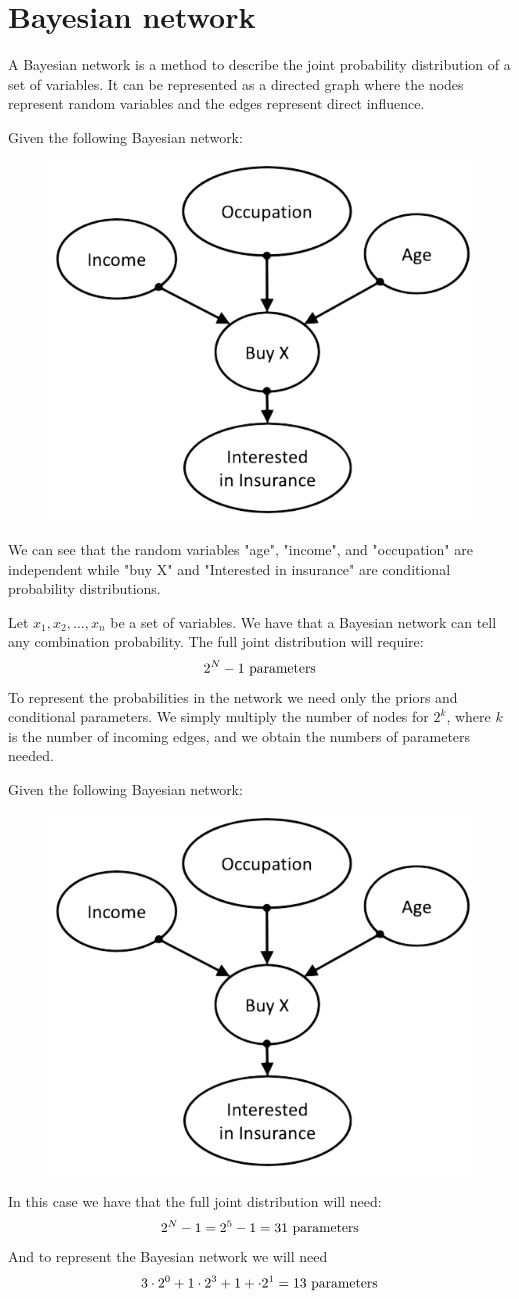 \documentclass[12pt, a4paper]{report}
\begin{document}
    \section{Bayesian network}
    A Bayesian network is a method to describe the joint probability distribution of a set of variables. It can be represented as a 
    directed graph where the nodes represent random variables and the edges represent direct influence. 
    \begin{example}
        Given the following Bayesian network:
        \begin{figure}[H]
            \centering
            \includegraphics[width=0.4\linewidth]{images/insurance.png}
        \end{figure}
        We can see that the random variables "age", "income", and "occupation" are independent while "buy X" and 
        "Interested in insurance" are conditional probability distributions. 
    \end{example}
    Let $x_1,x_2,\dots,x_n$ be a set of variables. We have that a Bayesian network can tell any combination probability. The full joint 
    distribution will require: 
    \[2^N-1 \textnormal{ parameters}\] 
    To represent the probabilities in the network we need only the priors and conditional parameters. We simply multiply the number of
    nodes for $2^k$, where $k$ is the number of incoming edges, and we obtain the numbers of parameters needed. 
    \begin{example}
        Given the following Bayesian network:
        \begin{figure}[H]
            \centering
            \includegraphics[width=0.4\linewidth]{images/insurance.png}
        \end{figure}
        In this case we have that the full joint distribution will need: 
        \[2^N-1=2^5-1=31 \textnormal{ parameters}\]
        And to represent the Bayesian network we will need 
        \[3 \cdot 2^0 + 1 \cdot 2^3 + 1+ \cdot 2^1 = 13 \textnormal{ parameters}\]
    \end{example}
\end{document}
